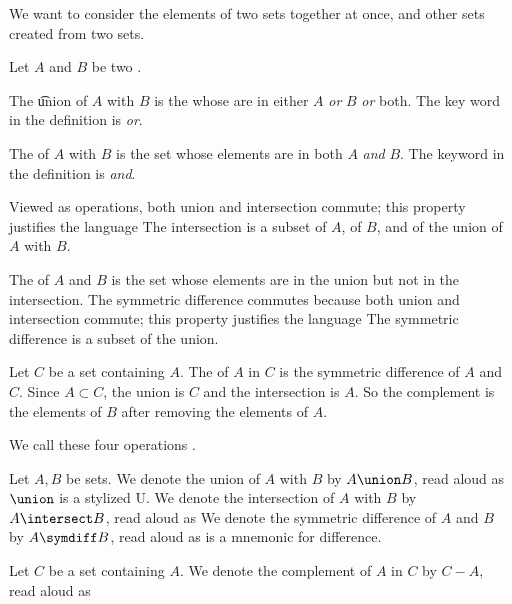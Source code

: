

We want to consider the elements of two sets
together at once, and other sets created
from two sets.


Let $A$ and $B$ be two .

The \t{union} of $A$ with $B$ is the
 whose  are
in either $A$ \textit{or} $B$ \textit{or} both.
The key word in the definition is \textit{or}.

The  of $A$ with $B$ is
the set whose elements are in both $A$ \textit{and} $B$.
The keyword in the definition is \textit{and}.

Viewed as operations, both union and intersection commute;
this property justifies the language 
The intersection is a subset of $A$, of $B$,
and of the union of $A$ with $B$.

The 
of $A$ and $B$ is the set whose elements are in the union
but not in the intersection.
The symmetric difference commutes because both union and
intersection commute; this property justifies the
language 
The symmetric difference is a subset of the union.


Let $C$ be a set containing $A$.
The  of $A$ in $C$ is
the symmetric difference of $A$ and $C$.
Since $A \subset C$, the union is $C$ and the
intersection is $A$.
So the complement is the  elements of $B$ after removing the elements of $A$.

We call these four operations
.


Let $A, B$ be sets.
We denote the union of $A$ with $B$ by $A \union B$, read aloud as 
$\union$ is a stylized U.
We denote the intersection of $A$ with $B$ by $A \intersect B$, read aloud as 
We denote the symmetric difference of $A$ and $B$ by $A \symdiff B$, read aloud as 
 is a mnemonic for difference.

Let $C$ be a set containing $A$.
We denote the complement of $A$ in $C$ by $C - A$, read aloud as 


